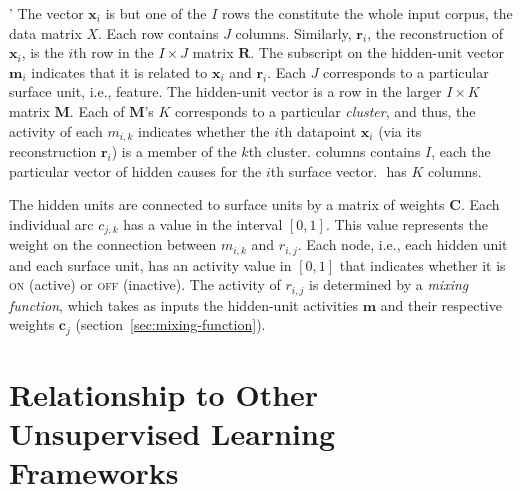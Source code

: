 '
The vector $\mathbf{x}_i$ is but one of the $I$ rows the constitute the whole 
input corpus, the data matrix $X$. Each row contains $J$ columns. Similarly, 
$\mathbf{r}_i$, the reconstruction of $\mathbf{x}_i$, is the $i$th row in the 
$I \times J$ matrix $\mathbf{R}$. The subscript on the hidden-unit vector 
$\mathbf{m}_i$ indicates that it is related to $\mathbf{x}_i$ and $\mathbf{r}_i$. 
Each $J$ corresponds to a particular surface unit, i.e., feature. 
The hidden-unit vector is a row in the larger $I \times K$ matrix 
$\mathbf{M}$. Each of $\mathbf{M}$'s $K$ corresponds to a particular 
\emph{cluster}, and thus, the activity of each $m_{i,k}$ indicates whether the $i$th 
datapoint $\mathbf{x}_i$ (via its reconstruction $\mathbf{r}_i$) is a member of the 
$k$th cluster.  columns contains $I$, each the particular vector of hidden causes for 
the $i$th surface vector. $\mathbf{}$ has $K$ columns.

%
%
%
The hidden units are connected to surface units by a matrix of weights $\mathbf{C}$. 
Each individual arc $c_{j,k}$ has a value in the interval $[0,1]$. This value 
represents the weight on the connection between $m_{i,k}$ and $r_{i,j}$.
Each node, i.e., each hidden unit and each surface unit, has an activity value in $[0,1]$ that
indicates whether it is \textsc{on} (active) or \textsc{off} (inactive).
The activity of $r_{i,j}$ is determined by a \emph{mixing function}, which takes as inputs the 
hidden-unit activities $\mathbf{m}$ and their respective weights $\mathbf{c}_j$
(section~\ref{sec:mixing-function}).



\section{Relationship to Other Unsupervised Learning Frameworks}
\label{sec:context}

